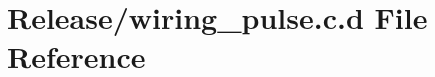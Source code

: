 \hypertarget{_release_2wiring__pulse_8c_8d}{\section{\-Release/wiring\-\_\-pulse.c.\-d \-File \-Reference}
\label{_release_2wiring__pulse_8c_8d}
}
